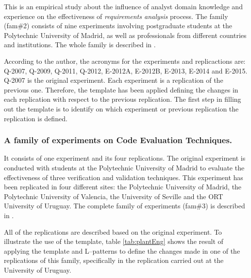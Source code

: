 This is an empirical study about  the influence of analyst domain knowledge and experience on the effectiveness of \emph{requirements analysis} process. The family (fam\#2) consists of nine experiments involving postgraduate students at the Polytechnic University of Madrid, as well as professionals from different countries and institutions. The whole family is described in \cite{aranda2016estudio}.

According to the author, the acronyms for the experiments and replicactions are: Q-2007, Q-2009, Q-2011, Q-2012, E-2012A, E-2012B, E-2013, E-2014 and E-2015. Q-2007 is the original experiment. 
Each experiment is a replication of the previous one. Therefore, the template has been applied defining the changes in each replication with respect to the previous replication. %
The first step in filling out the template is to identify on which experiment or previous replication the replication is defined.

\subsubsection{A family of experiments on Code Evaluation Techniques.}

It consists of one experiment and its four replications. The original experiment is conducted with students at the Polytechnic University of Madrid to evaluate the effectiveness of three verification and validation techniques. This experiment has been replicated in four different sites: the Polytechnic University of Madrid, the Polytechnic University of Valencia, the University of Seville and the ORT University of Uruguay. The complete family of experiments (fam\#3) is described in \cite{juristo2012comparing,juristo2003functional,juristo2013process}.
%





All of the replications are described based on the original experiment.
To illustrate the use of the template, table \ref{tab:plantEng} shows the result of applying the template and L–patterns to define the changes made in one of the replications of this family, specifically in the replication carried out at the University of Uruguay.


